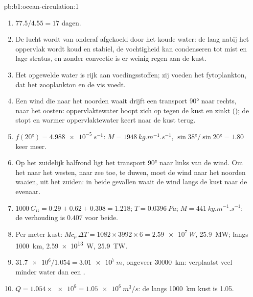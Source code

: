 \begin{solution}{pb:b1:ocean-circulation:1}
\begin{enumerate}
  \item $77.5/4.55 = 17$ dagen.
  \item De lucht wordt van onderaf afgekoeld door het koude water: de laag nabij het oppervlak wordt koud en stabiel, de vochtigheid kan condenseren tot mist en lage stratus, en zonder convectie is er weinig regen aan de kust.
  \item Het opgewelde water is rijk aan voedingsstoffen; zij voeden het fytoplankton, dat het zooplankton en de vis voedt.
  \item Een wind die naar het noorden waait drijft een transport \ang{90} naar rechts, naar het oosten: oppervlaktewater hoopt zich op tegen de kust en zinkt (); de  stopt en warmer oppervlaktewater keert naar de kust terug.
  \item $f(\ang{20}) = \qty{4.988e-5}{s^{-1}}$: $M = \qty{1948}{kg.m^{-1}.s^{-1}}$,
        $\sin\ang{38}/\sin\ang{20} = 1.80$ keer meer.
  \item Op het zuidelijk halfrond ligt het transport \ang{90} naar links van de wind. Om het naar het westen, naar zee toe, te duwen, moet de wind naar het noorden waaien, uit het zuiden: in beide gevallen waait de wind langs de kust naar de evenaar.
  \item $1000\,C_D = 0.29 + 0.62 + 0.308 = 1.218$; $T = \qty{0.0396}{Pa}$; $M =
        \qty{441}{kg.m^{-1}.s^{-1}}$; de verhouding is $0.407$ voor beide.
  \item Per meter kust: $M c_p\,\Delta T = 1082 \times 3992 \times 6 =
        \qty{2.59e7}{W}$, \qty{25.9}{MW}; langs \qty{1000}{km}, \qty{2.59e13}{W},
        \qty{25.9}{TW}.
  \item $\num{31.7e6}/1.054 = \qty{3.01e7}{m}$, ongeveer \qty{30000}{km}:  verplaatst veel minder water dan een .
  \item $Q = 1.054 \times \num{e6} = \qty{1.05e6}{m^3/s}$: de  langs \qty{1000}{km} kust is \qty{1.05}{\sverdrup}.
\end{enumerate}
\end{solution}
